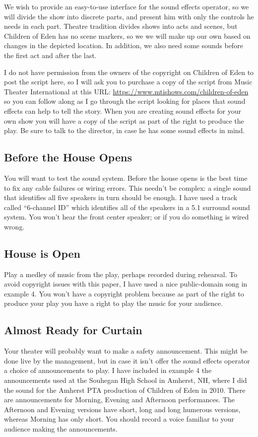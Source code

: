 \documentclass[letterpaper,twoside]{article}
\begin{document}
We wish to provide an easy-to-use interface for the sound effects
operator, so we will divide the show into discrete parts, and present
him with only the controls he needs in each part.  Theatre tradition
divides shows into acts and scenes, but Children of Eden has no scene
markers, so we we will make up our own based on changes in
the depicted location.
In addition, we also need some sounds before the first act and after the last.

I do not have permission from the owners of the copyright on
Children of Eden to post the script here, so I will ask you
to purchase a copy of the script from Music Theater International
at this URL: \url{https://www.mtishows.com/children-of-eden}
so you can follow along as I go through the script looking for
places that sound effects can help to tell the story.  When you are
creating sound effects for your own show you will have a copy of
the script as part of the right to produce the play.  Be sure to
talk to the director, in case he has some sound effects in mind.

\subsection{Before the House Opens}
You will want to test the sound system.  Before the house opens is the best
time to fix any cable failures or wiring errors.  This needn't be complex:
a single sound that identifies all five speakers in turn should be enough.
I have used a track called ``6-channel ID'' which identifies all of the
speakers in a 5.1 surround sound system.  You won't hear the front
center speaker; or if you do something is wired wrong.

\subsection{House is Open}
Play a medley of music from the play, perhaps recorded during rehearsal.
To avoid copyright issues with this paper, I have used a nice public-domain song
in example 4.  You won't have a copyright problem because as part of the right
to produce your play you have a right to play the music for your audience.

\subsection{Almost Ready for Curtain}
Your theater will probably want to make a safety announcement.
This might be done live by the management, but in case it isn't
offer the sound effects operator a choice of announcements
to play.  I have included in example 4 the announcements used at
the Souhegan High School in Amherst, NH, where I did the sound
for the Amherst PTA production of Children of Eden in 2010.
There are announcements for Morning, Evening and Afternoon
performances.  The Afternoon and Evening versions have
short, long and long humerous versions, whereas Morning
has only short.  You should record a voice familiar to your audience
making the announcements.
\end{document}
